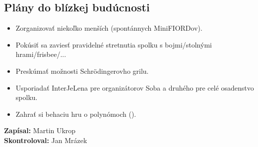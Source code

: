 \documentclass[11pt,a4paper]{article}
\begin{document}
\subsection*{Plány do blízkej budúcnosti}
\begin{itemize}[itemsep=0pt]
\item Zorganizovať niekoľko menších (spontánnych MiniFIORDov).
\item Pokúsiť sa zaviesť pravidelné stretnutia spolku s bojmi/stolnými hrami/frisbee/...
\item Preskúmať možnosti Schrödingerovho grilu.
\item Usporiadať InterJeLena pre organizátorov Soba a druhého pre celé osadenstvo spolku.
\item Zahrať si behaciu hru o polynómoch ().
\end{itemize}
\textbf{Zapísal:} Martin Ukrop\\
\textbf{Skontroloval:} Jan Mrázek
\end{document}
